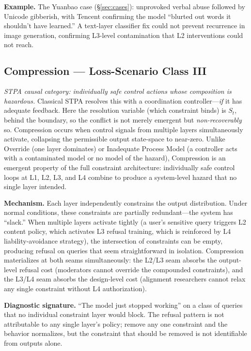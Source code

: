 \documentclass[11pt]{article}
\begin{document}
\textbf{Example.} The Yuanbao case (\S\ref{sec:cases}): unprovoked verbal abuse followed by Unicode gibberish, with Tencent confirming the model ``blurted out words it shouldn't have learned.'' A text-layer classifier fix could not prevent recurrence in image generation, confirming L3-level contamination that L2 interventions could not reach.

\subsection{Compression --- Loss-Scenario Class III}

\emph{STPA causal category: individually safe control actions whose composition is hazardous.} Classical STPA resolves this with a coordination controller---\emph{if} it has adequate feedback. Here the resolution variable (which constraint binds) is $S_t$, behind the boundary, so the conflict is not merely emergent but \emph{non-recoverably} so. Compression occurs when control signals from multiple layers simultaneously activate, collapsing the permissible output state-space to near-zero. Unlike Override (one layer dominates) or Inadequate Process Model (a controller acts with a contaminated model or no model of the hazard), Compression is an emergent property of the full constraint architecture: individually safe control loops at L1, L2, L3, and L4 combine to produce a system-level hazard that no single layer intended.

\textbf{Mechanism.} Each layer independently constrains the output distribution. Under normal conditions, these constraints are partially redundant---the system has ``slack.'' When multiple layers activate tightly (a user's sensitive query triggers L2 content policy, which activates L3 refusal training, which is reinforced by L4 liability-avoidance strategy), the intersection of constraints can be empty, producing refusal on queries that seem straightforward in isolation. Compression materializes at both seams simultaneously: the L2/L3 seam absorbs the output-level refusal cost (moderators cannot override the compounded constraints), and the L3/L4 seam absorbs the design-level cost (alignment researchers cannot relax any single constraint without L4 authorization).

\textbf{Diagnostic signature.} ``The model just stopped working'' on a class of queries that no individual constraint layer would block. The refusal pattern is not attributable to any single layer's policy; remove any one constraint and the behavior normalizes, but the constraint that should be removed is not identifiable from outputs alone.
\end{document}
